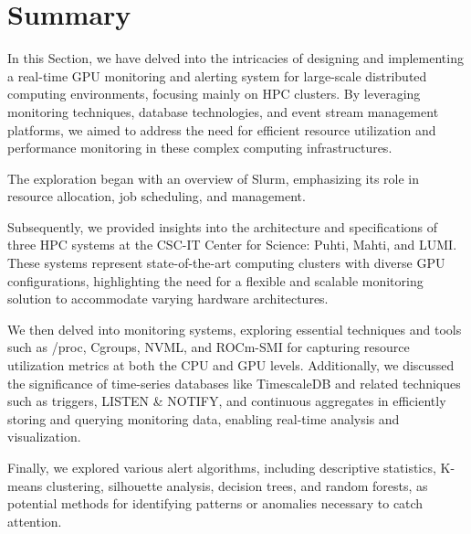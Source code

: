 \section{Summary}
In this Section, we have delved into the intricacies of designing and implementing a real-time GPU monitoring and alerting system for large-scale distributed computing environments, focusing mainly on HPC clusters. By leveraging monitoring techniques, database technologies, and event stream management platforms, we aimed to address the need for efficient resource utilization and performance monitoring in these complex computing infrastructures.

The exploration began with an overview of Slurm, emphasizing its role in resource allocation, job scheduling, and management.

Subsequently, we provided insights into the architecture and specifications of three HPC systems at the CSC-IT Center for Science: Puhti, Mahti, and LUMI. These systems represent state-of-the-art computing clusters with diverse GPU configurations, highlighting the need for a flexible and scalable monitoring solution to accommodate varying hardware architectures.

We then delved into monitoring systems, exploring essential techniques and tools such as /proc, Cgroups, NVML, and ROCm-SMI for capturing resource utilization metrics at both the CPU and GPU levels. Additionally, we discussed the significance of time-series databases like TimescaleDB and related techniques such as triggers, LISTEN \& NOTIFY, and continuous aggregates in efficiently storing and querying monitoring data, enabling real-time analysis and visualization.


Finally, we explored various alert algorithms, including descriptive statistics, K-means clustering, silhouette analysis, decision trees, and random forests, as potential methods for identifying patterns or anomalies necessary to catch attention.

